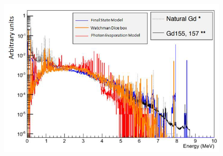 \begin{figure}[H]
 \centering
 \includegraphics[width=0.7\linewidth]{Chapter4/Figs/Raster/gadolinium/comparisonAndDiceBoxGd.png}
 \label{fig:comparisonAndDiceBoxGd}
\end{figure}

